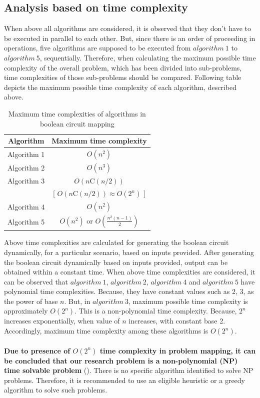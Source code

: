 \subsection{Analysis based on time complexity}
When above all algorithms are considered, it is observed that they don't have to be executed in parallel to each other. But, since there is an order of proceeding in operations, five algorithms are supposed to be executed from $algorithm\ 1$ to $algorithm\ 5$, sequentially. Therefore, when calculating the maximum possible time complexity of the overall problem, which has been divided into sub-problems, time complexities of those sub-problems should be compared. Following table depicts the maximum possible time complexity of each algorithm, described above.
\begin{table}[H]
    \renewcommand{\arraystretch}{1.5}
    \centering
    \begin{tabular}{|c|c|}
    \hline
    \textbf{Algorithm} & \textbf{Maximum time complexity} \\
    \hline
    Algorithm 1 & $O(n^2)$ \\
    \hline
    Algorithm 2 & $O(n^3)$ \\
    \hline
    Algorithm 3 & $O(n \text{C} (n/2))$ \\
    \  & [ $O(n \text{C} (n/2)) \approx O(2^n)$ ] \\
    \hline
    Algorithm 4 & $O(n^2)$ \\
    \hline
    Algorithm 5 & $O(n^2)$ or $O(\frac{n^2(n - 1)}{2})$ \\
    \hline
    \end{tabular}
    \caption{Maximum time complexities of algorithms in boolean circuit mapping}
    \label{tab:maximum time complexities of algorithms in boolean circuit mapping}
\end{table}

Above time complexities are calculated for generating the boolean circuit dynamically, for a particular scenario, based on inputs provided. After generating the boolean circuit dynamically based on inputs provided, output can be obtained within a constant time. When above time complexities are considered, it can be observed that $algorithm\ 1$, $algorithm\ 2$, $algorithm\ 4$ and $algorithm\ 5$ have polynomial time complexities. Because, they have constant values such as 2, 3, as the power of base $n$. But, in $algorithm\ 3$, maximum possible time complexity is approximately $O(2^n)$. This is a non-polynomial time complexity. Because, $2^n$ increases exponentially, when value of $n$ increases, with constant base 2. Accordingly, maximum time complexity among these algorithms is $O(2^n)$.\\ \\
\textbf{Due to presence of $O(2^n)$ time complexity in problem mapping, it can be concluded that our research problem is a non-polynomial (NP) time solvable problem}  (\cite{pfleeger1996chapter3}). There is no specific algorithm identified to solve NP problems. Therefore, it is recommended to use an eligible heuristic or a greedy algorithm to solve such problems. \\ \\


